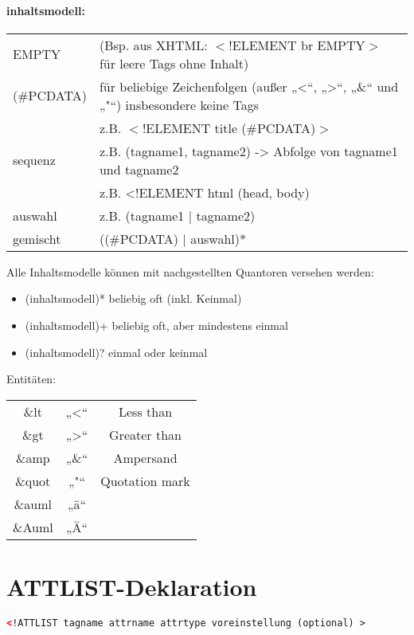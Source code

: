 \paragraph{inhaltsmodell:}\hspace*{0,5mm}\linebreak
\begin{tabular}{ll}
  EMPTY & (Bsp. aus XHTML: $<$!ELEMENT br EMPTY$>$ für leere Tags ohne Inhalt)\\
  (\#PCDATA) & für beliebige Zeichenfolgen (außer „\textless“, „\textgreater“, „\&“ und „"“) insbesondere keine Tags\\
   & z.B. $<$!ELEMENT title (\#PCDATA)$>$\\
  sequenz & z.B. (tagname1, tagname2) -> Abfolge von tagname1 und tagname2\\
   & z.B. <!ELEMENT html (head, body)\\
  auswahl & z.B. (tagname1 | tagname2)\\
  gemischt & ((\#PCDATA) | auswahl)*  
\end{tabular}
\vspace*{2mm}

Alle Inhaltsmodelle können mit nachgestellten Quantoren versehen werden:
\begin{itemize}
\item (inhaltsmodell)* beliebig oft (inkl. Keinmal)
\item (inhaltsmodell)+	beliebig oft, aber mindestens einmal
\item (inhaltsmodell)?	einmal oder keinmal
\end{itemize}
\vspace*{2mm}

Entitäten:\\
\begin{tabular}{ccc}
  \&lt & „\textless“ & Less than\\
  \&gt & „\textgreater“ & Greater than\\
  \&amp	& „\&“	& Ampersand\\
  \&quot & „"“ & Quotation mark\\
  \&auml & „ä“ & \\
  \&Auml & „Ä“ & \\	
\end{tabular}

\newpage
\section{ATTLIST-Deklaration}
\begin{lstlisting}[caption={Syntax einer ATTLIST-Deklaration}, label={lst:attlist}, language={XML}]
  <!ATTLIST tagname attrname attrtype voreinstellung (optional) > 
\end{lstlisting}
